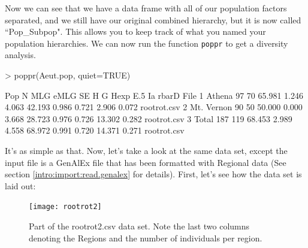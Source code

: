 \documentclass[letterpaper]{article}
\begin{document}
Now we can see that we have a data frame with all of our population factors separated, and we still have our original combined hierarchy, but it is now called ``Pop\_Subpop". This allows you to keep track of what you named your population hierarchies. We can now run the function \texttt{poppr} to get a diversity analysis.
\begin{Schunk}
\begin{Sinput}
> poppr(Aeut.pop, quiet=TRUE)
\end{Sinput}
\begin{Soutput}
         Pop   N MLG   eMLG    SE     H      G  Hexp   E.5     Ia rbarD        File
1     Athena  97  70 65.981 1.246 4.063 42.193 0.986 0.721  2.906 0.072 rootrot.csv
2 Mt. Vernon  90  50 50.000 0.000 3.668 28.723 0.976 0.726 13.302 0.282 rootrot.csv
3      Total 187 119 68.453 2.989 4.558 68.972 0.991 0.720 14.371 0.271 rootrot.csv
\end{Soutput}
\end{Schunk}
It's as simple as that. Now, let's take a look at the same data set, except the input file is a GenAlEx file that has been formatted with Regional data (See section \ref{intro:import:read.genalex} for details). First, let's see how the data set is laid out:


\begin{figure}[h!]
  \centering
  \caption{\footnotesize \footnotesize Part of the rootrot2.csv data set. Note the last two columns denoting the Regions and the number of individuals per region.}
  \label{rootrot2_csv}
\texttt{[image: rootrot2]}
\end{figure}

\begin{center}
\end{center}
\end{document}
